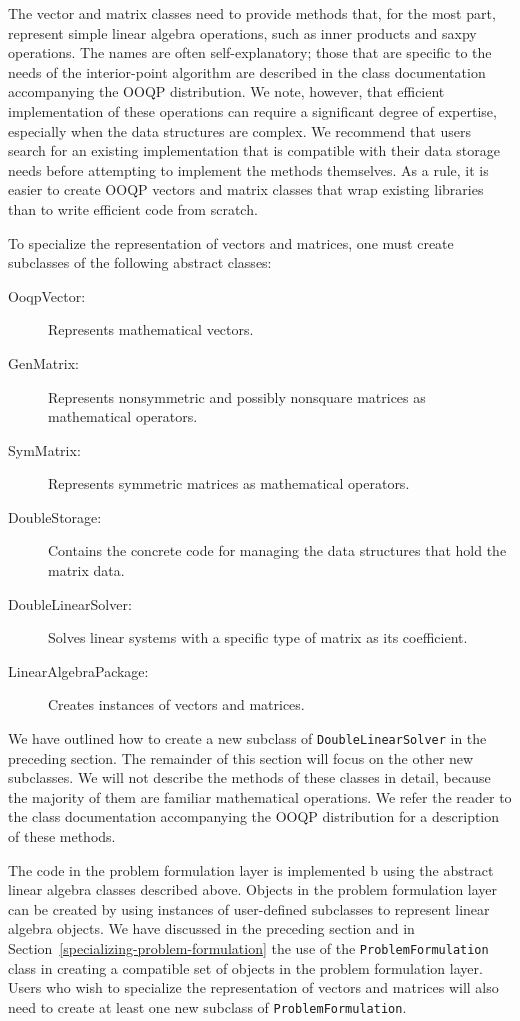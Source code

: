 The vector and matrix classes need to provide methods that, for the
most part, represent simple linear algebra operations, such as inner
products and saxpy operations.  The names are often
self-explanatory; those that are specific to the needs of the
interior-point algorithm are described in the class documentation
accompanying the OOQP distribution. We note, however, that efficient
implementation of these operations can require a significant degree of
expertise, especially when the data structures are complex. We
recommend that users search for an existing implementation that is
compatible with their data storage needs before attempting to
implement the methods themselves. As a rule, it is easier to create
OOQP vectors and matrix classes that wrap existing libraries than to
write efficient code from scratch.

To specialize the representation of vectors and matrices, one must
create subclasses of the following abstract classes:
\begin{description}
  \item[OoqpVector:] Represents mathematical vectors.
  \item[GenMatrix:] Represents nonsymmetric and possibly
    nonsquare matrices as mathematical operators.
  \item[SymMatrix:] Represents symmetric matrices as mathematical operators.
  \item[DoubleStorage:] Contains the concrete code for managing the
    data structures that hold the matrix data.
  \item[DoubleLinearSolver:] Solves linear systems with a specific type
    of matrix as its coefficient.
  \item[LinearAlgebraPackage:] Creates instances of vectors and matrices.
\end{description}
We have outlined how to create a new subclass of
\texttt{DoubleLinearSolver} in the preceding section. The remainder
of this section will focus on the other new subclasses. We will not
describe the methods of these classes in detail, because the majority
of them are familiar mathematical operations. We refer the reader to
the class documentation accompanying the OOQP distribution for a
description of these methods.

The code in the  problem formulation layer is implemented b using the
abstract linear algebra classes described above. Objects in the
problem formulation layer can be created by using instances of
user-defined subclasses to represent linear algebra objects. We have
discussed in the preceding section and in
Section~\ref{specializing-problem-formulation} the use of the
\texttt{ProblemFormulation} class in creating a compatible set of
objects in the problem formulation layer. Users who wish
to specialize the representation of vectors and matrices will also
need to create at least one new subclass of
\texttt{ProblemFormulation}.

